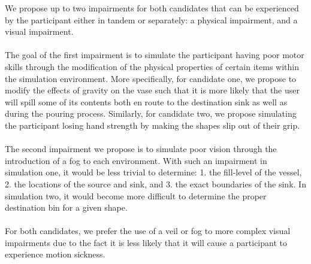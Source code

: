 \documentclass{article}
\begin{document}
We propose up to two impairments for both candidates that can be experienced by the participant either in tandem or separately: a physical impairment, and a visual impairment.
\\
\\
The goal of the first impairment is to simulate the participant having poor motor skills through the modification of the physical properties of certain items within the simulation environment. More specifically, for candidate one, we propose to modify the effects of gravity on the vase such that it is more likely that the user will spill some of its contents both en route to the destination sink as well as during the pouring process. Similarly, for candidate two, we propose simulating the participant losing hand strength by making the shapes slip out of their grip.
\\
\\
The second impairment we propose is to simulate poor vision through the introduction of a fog to each environment. With such an impairment in simulation one, it would be less trivial to determine: 1. the fill-level of the vessel, 2. the locations of the source and sink, and 3. the exact boundaries of the sink. In simulation two, it would become more difficult to determine the proper destination bin for a given shape.
\\
\\
For both candidates, we prefer the use of a veil or fog to more complex visual impairments due to the fact it is less likely that it will cause a participant to experience motion sickness.
\end{document}
